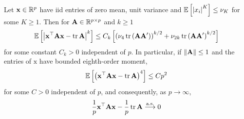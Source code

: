 \begin{lemma} \label{lem:quadratic-form-close-to-the-trace}
	Let ${\bf x} \in {\mathbb R}^{p}$ have iid entries of zero mean, unit variance and ${\mathbb E}\left[\left|x_{i}\right|^{K}\right] \leq \nu_{K}$ for some $K \geq 1$. Then for ${\bf A} \in {\mathbb R}^{p \times p}$ and $k \geq 1$
	$$
		{\mathbb E}\left[\left|{\bf x}^{\top} {\bf A} {\bf x}-\operatorname{tr} {\bf A}\right|^{k}\right] \leq C_{k}\left[\left(\nu_{4} \operatorname{tr}\left({\bf A} {\bf A}^{\prime}\right)\right)^{k / 2}+\nu_{2 k} \operatorname{tr}\left({\bf A} {\bf A}^{\prime}\right)^{k / 2}\right]
	$$
	for some constant $C_{k}>0$ independent of $p$. In particular, if $\|{\bf A}\| \leq 1$ and the entries of $\mathrm{x}$ have bounded eighth-order moment,
	$$
		{\mathbb E}\left[\left({\bf x}^{\top} {\bf A} {\bf x}-\operatorname{tr} {\bf A}\right)^{4}\right] \leq C p^{2}
	$$
	for some $C>0$ independent of $p$, and consequently, as $p \rightarrow \infty$,
	$$
		\frac{1}{p} {\bf x}^{\top} {\bf A} {\bf x}-\frac{1}{p} \operatorname{tr} {\bf A} \stackrel{\text {a.s.}}{\longrightarrow} 0
	$$
\end{lemma}
